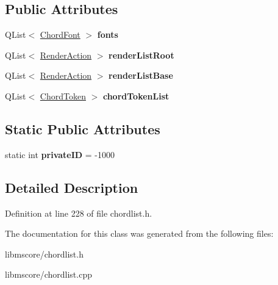 \subsection*{Public Attributes}
\begin{DoxyCompactItemize}
\item 
\mbox{\label{class_ms_1_1_chord_list_a4b9a1163f99f31a7b1b8137fd83bbe2d}} 
Q\+List$<$ \hyperlink{struct_ms_1_1_chord_font}{Chord\+Font} $>$ {\bfseries fonts}
\item 
\mbox{\label{class_ms_1_1_chord_list_ae2587931a4beac56ffdd175382f6dd72}} 
Q\+List$<$ \hyperlink{struct_ms_1_1_render_action}{Render\+Action} $>$ {\bfseries render\+List\+Root}
\item 
\mbox{\label{class_ms_1_1_chord_list_afa63dc61c1f29b5844addf815ec73867}} 
Q\+List$<$ \hyperlink{struct_ms_1_1_render_action}{Render\+Action} $>$ {\bfseries render\+List\+Base}
\item 
\mbox{\label{class_ms_1_1_chord_list_ac4e402d4d569f47b3b7597f08fb0353e}} 
Q\+List$<$ \hyperlink{class_ms_1_1_chord_token}{Chord\+Token} $>$ {\bfseries chord\+Token\+List}
\end{DoxyCompactItemize}
\subsection*{Static Public Attributes}
\begin{DoxyCompactItemize}
\item 
\mbox{\label{class_ms_1_1_chord_list_a83ba4d8b0cb17f087decaa76f7b0947b}} 
static int {\bfseries private\+ID} = -\/1000
\end{DoxyCompactItemize}


\subsection{Detailed Description}


Definition at line 228 of file chordlist.\+h.



The documentation for this class was generated from the following files\+:\begin{DoxyCompactItemize}
\item 
libmscore/chordlist.\+h\item 
libmscore/chordlist.\+cpp\end{DoxyCompactItemize}
